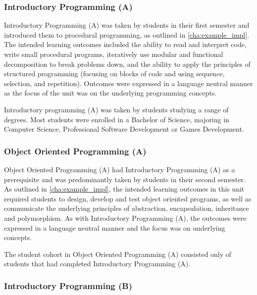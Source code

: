 \subsubsection{Introductory Programming (A)} %
\label{ssub:introductory_programming_a}

Introductory Programming (A) was taken by students in their first semester and introduced them to procedural programming, as outlined in \cref{cha:example_impl}. The intended learning outcomes included the ability to read and interpret code, write small procedural programs, iteratively use modular and functional decomposition to break problems down, and the ability to apply the principles of structured programming (focusing on blocks of code and using sequence, selection, and repetition). Outcomes were expressed in a language neutral manner as the focus of the unit was on the underlying programming concepts.

Introductory programming (A) was taken by students studying a range of degrees. Most students were enrolled in a Bachelor of Science, majoring in Computer Science, Professional Software Development or Games Development.


\subsubsection{Object Oriented Programming (A)} %
\label{ssub:object_oriented_programming_a}

Object Oriented Programming (A) had Introductory Programming (A) as a prerequisite and was predominantly taken by students in their second semester. As outlined in \cref{cha:example_impl}, the intended learning outcomes in this unit required students to design, develop and test object oriented programs, as well as communicate the underlying principles of abstraction, encapsulation, inheritance and polymorphism. As with Introductory Programming (A), the outcomes were expressed in a language neutral manner and the focus was on underlying concepts.

The student cohort in Object Oriented Programming (A) consisted only of students that had completed Introductory Programming (A).


\subsubsection{Introductory Programming (B)} %
\label{ssub:introductory_programming_b}

